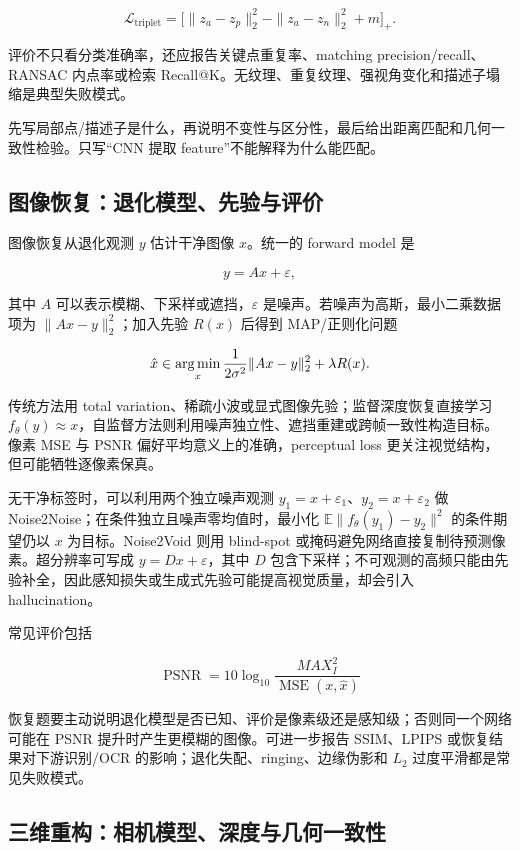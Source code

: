 \[
  \mathcal L_{\mathrm{triplet}}
  =\bigl[\|z_a-z_p\|_2^2-\|z_a-z_n\|_2^2+m\bigr]_+.
\]

评价不只看分类准确率，还应报告关键点重复率、matching precision/recall、RANSAC 内点率或检索 Recall@K。无纹理、重复纹理、强视角变化和描述子塌缩是典型失败模式。

\begin{examnote}[特征题答题骨架]
先写局部点/描述子是什么，再说明不变性与区分性，最后给出距离匹配和几何一致性检验。只写“CNN 提取 feature”不能解释为什么能匹配。
\end{examnote}

\subsection{图像恢复：退化模型、先验与评价}

图像恢复从退化观测 \(y\) 估计干净图像 \(x\)。统一的 forward model 是

\[
  y=Ax+\varepsilon,
\]

其中 \(A\) 可以表示模糊、下采样或遮挡，\(\varepsilon\) 是噪声。若噪声为高斯，最小二乘数据项为 \(\|Ax-y\|_2^2\)；加入先验 \(R(x)\) 后得到 MAP/正则化问题

\[
  \hat x
  \in
  \operatorname*{arg\,min}_x
  \frac{1}{2\sigma^2}\|Ax-y\|_2^2+\lambda R(x).
\]

传统方法用 total variation、稀疏小波或显式图像先验；监督深度恢复直接学习 \(f_\theta(y)\approx x\)，自监督方法则利用噪声独立性、遮挡重建或跨帧一致性构造目标。像素 MSE 与 PSNR 偏好平均意义上的准确，perceptual loss 更关注视觉结构，但可能牺牲逐像素保真。

无干净标签时，可以利用两个独立噪声观测 \(y_1=x+\varepsilon_1\)、\(y_2=x+\varepsilon_2\) 做 Noise2Noise；在条件独立且噪声零均值时，最小化 \(\mathbb E\|f_\theta(y_1)-y_2\|^2\) 的条件期望仍以 \(x\) 为目标。Noise2Void 则用 blind-spot 或掩码避免网络直接复制待预测像素。超分辨率可写成 \(y=Dx+\varepsilon\)，其中 \(D\) 包含下采样；不可观测的高频只能由先验补全，因此感知损失或生成式先验可能提高视觉质量，却会引入 hallucination。

常见评价包括

\[
  \operatorname{PSNR}=10\log_{10}\frac{MAX_I^2}{\operatorname{MSE}(x,\hat x)}
\]

恢复题要主动说明退化模型是否已知、评价是像素级还是感知级；否则同一个网络可能在 PSNR 提升时产生更模糊的图像。可进一步报告 SSIM、LPIPS 或恢复结果对下游识别/OCR 的影响；退化失配、ringing、边缘伪影和 \(L_2\) 过度平滑都是常见失败模式。

\subsection{三维重构：相机模型、深度与几何一致性}

